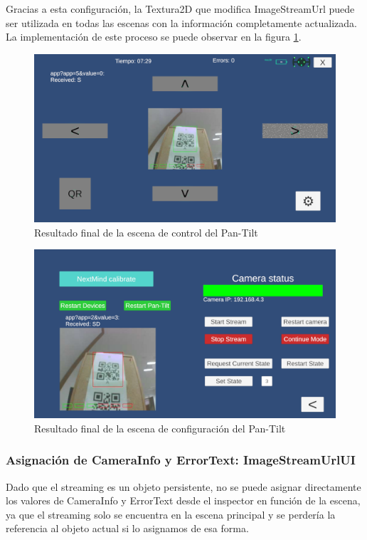 Gracias a esta configuración, la Textura2D que modifica ImageStreamUrl puede ser utilizada en todas las escenas con la información completamente actualizada. La implementación de este proceso se puede observar en la figura \ref{figure:camera-works-pan-tilt-scene}.

\begin{figure}[!htb]
   \centering
    \includegraphics[width=0.8\linewidth]{figures/camera-works-pan-tilt-scene-current.png}
   \caption{Resultado final de la escena de control del Pan-Tilt}
   \label{figure:camera-works-pan-tilt-scene}
\end{figure}

\begin{figure}[!htb]
   \centering
    \includegraphics[width=0.8\linewidth]{figures/camera-works-configuration-scene-current.png}
   \caption{Resultado final de la escena de configuración del Pan-Tilt}
   \label{figure:camera-works-configuration-scene}
\end{figure}

\subsubsection{Asignación de CameraInfo y ErrorText: ImageStreamUrlUI}
Dado que el streaming es un objeto persistente, no se puede asignar directamente los valores de CameraInfo y ErrorText desde el inspector en función de la escena, ya que el streaming solo se encuentra en la escena principal y se perdería la referencia al objeto actual si lo asignamos de esa forma.



